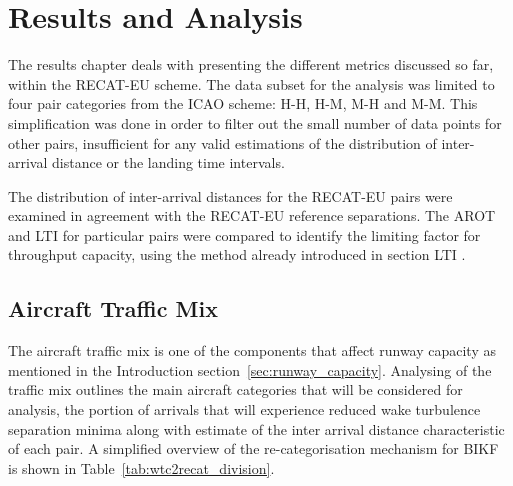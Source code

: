 \chapter{Results and Analysis\label{cha:results_analysis}}

The results chapter deals with presenting the different metrics discussed so far, within the RECAT-EU scheme. The data subset for the analysis was limited to four pair categories from the ICAO scheme: H-H, H-M, M-H and M-M. This simplification was done in order to filter out the small number of data points for other pairs, insufficient for any valid estimations of the distribution of inter-arrival distance or the landing time intervals. 

The distribution of inter-arrival distances for the RECAT-EU pairs were examined in agreement with the RECAT-EU reference separations. The AROT and LTI for particular pairs were compared to identify the limiting factor for throughput capacity, using the method already introduced in section LTI  .

\section{Aircraft Traffic Mix\label{sec:traffic_mix}}

The aircraft traffic mix is one of the components that affect runway capacity as mentioned in the Introduction section~\ref{sec:runway_capacity}. Analysing of the traffic mix outlines the main aircraft categories that will be considered for analysis, the portion of arrivals that will experience reduced wake turbulence separation minima along with estimate of the inter arrival distance characteristic of each pair. A simplified overview of the re-categorisation mechanism for BIKF is shown in Table~\ref{tab:wtc2recat_division}.

\begin{table}[h]
\centering
{}
\caption[Transition from ICAO WTC to RECAT-EU categories]{Transition from ICAO WTC to RECAT-EU categories. CAT-C combines aircraft from the ICAO Heavy and Medium categories and CAT-F combines aircraft from the Medium and Light categories. The categorisation process and criteria for assigning an existing aircraft type into RECAT-EU scheme is illustrated in detail in Figure~\ref{fig:RECAT_criteria}.}
\label{tab:wtc2recat_division}
\end{table}

